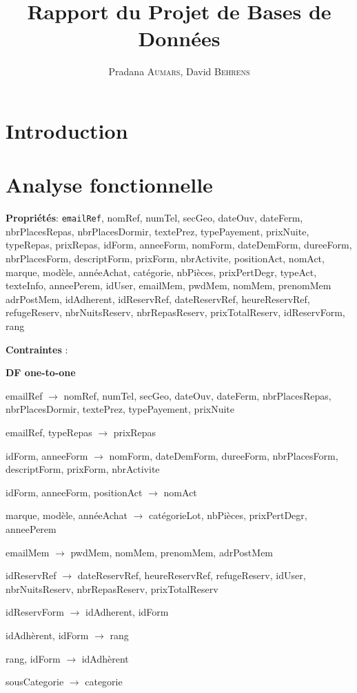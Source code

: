\documentclass[12pt, a4paper]{article}
\title{Rapport du Projet de Bases de Données}
\author{Pradana \textsc{Aumars}, David \textsc{Behrens}}
\begin{document}
\maketitle
\section{Introduction}
\section{Analyse fonctionnelle}
\textbf{Propriétés}: \textnhtt{emailRef}, nomRef, numTel, secGeo, dateOuv, dateFerm, nbrPlacesRepas, nbrPlacesDormir, textePrez, typePayement, prixNuite, typeRepas, prixRepas, idForm, anneeForm, nomForm, dateDemForm, dureeForm, nbrPlacesForm, descriptForm, prixForm, nbrActivite, positionAct, nomAct, marque, modèle, annéeAchat, catégorie, nbPièces, prixPertDegr, typeAct, texteInfo, anneePerem, idUser, emailMem, pwdMem, nomMem, prenomMem adrPostMem, idAdherent, idReservRef, dateReservRef, heureReservRef, refugeReserv, nbrNuitsReserv, nbrRepasReserv, prixTotalReserv, idReservForm, rang

\textbf{Contraintes} :

\textbf{DF one-to-one}

emailRef $\rightarrow$ nomRef, numTel, secGeo, dateOuv, dateFerm, nbrPlacesRepas, nbrPlacesDormir, textePrez, typePayement, prixNuite

emailRef, typeRepas $\rightarrow$ prixRepas

idForm, anneeForm $\rightarrow$ nomForm, dateDemForm, dureeForm, nbrPlacesForm, descriptForm, prixForm, nbrActivite

idForm, anneeForm, positionAct $\rightarrow$ nomAct

marque, modèle, annéeAchat $\rightarrow$ catégorieLot, nbPièces, prixPertDegr, anneePerem

emailMem $\rightarrow$ pwdMem, nomMem, prenomMem, adrPostMem

idReservRef $\rightarrow$ dateReservRef, heureReservRef, refugeReserv, idUser, nbrNuitsReserv, nbrRepasReserv, prixTotalReserv

idReservForm $\rightarrow$ idAdherent, idForm

idAdhèrent, idForm $\rightarrow$ rang

rang, idForm $\rightarrow$ idAdhèrent

sousCategorie $\rightarrow$ categorie
\end{document}
